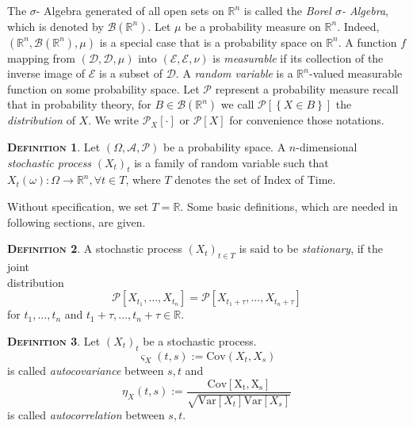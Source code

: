 \documentclass[a4paper, twoside, 11pt]{article}
\theoremstyle{definition}
\newtheorem{definition}{\scshape Definition}[section]
\def\bsigma{\mathscr{B}\brkt{\mathbb{R}^{n}}}
\newcommand{\sqbr}[1]{\left[ {#1} \right]}
\newcommand{\brkt}[1]{\left({#1} \right)}
\begin{document}
  The $\sigma$- Algebra generated of all open sets on $\mathbb{R}^{n}$ is called the \emph{Borel $\sigma$- Algebra}, which is denoted by $\mathscr{B}\left(\mathbb{R}^{n}\right)$. Let $\mu$ be a probability measure on $\mathbb{R}^{n}$. Indeed, $\brkt{\mathbb{R}^{n}, \mathscr{B}\brkt{\mathbb{R}^{n}}, \mu}$ is a special case that is a probability space on $\mathbb{R}^{n}$. A function $f$ mapping from $\brkt{\mathcal{D}, \mathscr{D}, \mu}$ into $\brkt{\mathcal{E}, \mathscr{E}, \nu}$ is \emph{measurable} if its collection of the inverse image of $\mathscr{E}$ is a subset of $\mathscr{D}$. A \emph{random variable} is a $\mathbb{R}^{n}$-valued measurable function on some probability space. Let $\mathcal{P}$ represent a probability measure recall that in probability theory, for $B \in \bsigma$ we call $\mathcal{P}\sqbr{\left\{X \in B\right\}}$ the \emph{distribution} of $X$. We write $\mathcal{P}_X \sqbr{\cdot}$ or $\mathcal{P}\sqbr{X}$ for convenience those notations.

  \begin{definition}
	Let $\brkt{\Omega, \mathscr{A}, \mathcal{P}}$ be a probability space. A $n$-dimensional \emph{stochastic process} $\brkt{X_t}_{t}$ is a family of random variable such that $X_t\brkt{\omega} : \Omega \longrightarrow  \mathbb{R}^{n},  \forall t \in T$, where $T$ denotes the set of Index of Time.    
  \end{definition}

  Without specification, we set $T=\mathbb{R}$. Some basic definitions, which are needed in following sections, are given.
  \begin{definition}
	A stochastic process $\brkt{X_t}_{t \in T}$ is said to be \emph{stationary}, if the joint \\distribution 
  \[
	\mathcal{P}\sqbr{X_{t_1},\dots,X_{t_n}} = \mathcal{P}\sqbr{X_{t_1+\tau},\dots,X_{t_n+\tau}} 
  \]
  for $t_1, \dots, t_n$ and $t_1+\tau,\dots,t_n+\tau \in \mathbb{R}$. 
  \label{sec:stn}
  \end{definition}

  \begin{definition}
	Let $(X_t)_t$ be a stochastic process. 
	\begin{equation*}
	  \varsigma_X(t,s) := \mathrm{Cov}(X_t, X_s) 
	\end{equation*} is called \emph{autocovariance} between $s, t$ and 
	\begin{equation*}
	  \eta_X(t, s) := \frac{\mathrm{Cov[X_t, X_s]}}{\sqrt{\mathrm{Var}[X_t]\mathrm{Var}[X_s]}}
	\end{equation*}
	is called \emph{autocorrelation} between $s, t$.
  \end{definition}
\end{document}
